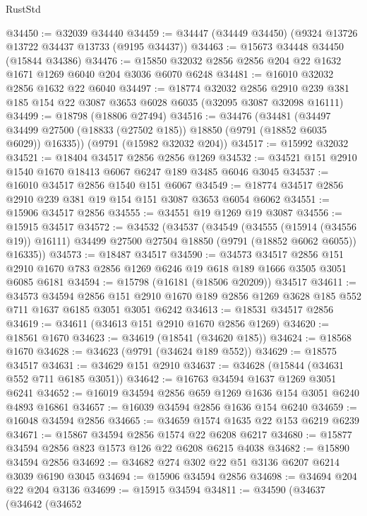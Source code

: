 \begin{lexlean}{RustStd}
\begin{coremodule}
@34450 := @32039 @34440
@34459 := @34447 (@34449 @34450) (@9324 @13726 @13722 @34437 @13733 (@9195 @34437))
@34463 := @15673 @34448 @34450 (@15844 @34386)
@34476 := @15850 @32032 @2856 @2856 @204 @22 @1632 @1671 @1269 @6040 @204 @3036 @6070 @6248
@34481 := @16010 @32032 @2856 @1632 @22 @6040
@34497 := @18774
    @32032
    @2856
    @2910
    @239
    @381
    @185
    @154
    @22
    @3087
    @3653
    @6028
    @6035
    (@32095 @3087 @32098 @16111)
@34499 := @18798 (@18806 @27494)
@34516 := @34476
    (@34481
      (@34497 @34499 @27500 (@18833 (@27502 @185)) @18850 (@9791 (@18852 @6035 @6029)) @16335))
    (@9791 (@15982 @32032 @204))
@34517 := @15992 @32032
@34521 := @18404 @34517 @2856 @2856 @1269
@34532 := @34521 @151 @2910 @1540 @1670 @18413 @6067 @6247 @189 @3485 @6046 @3045
@34537 := @16010 @34517 @2856 @1540 @151 @6067
@34549 := @18774 @34517 @2856 @2910 @239 @381 @19 @154 @151 @3087 @3653 @6054 @6062
@34551 := @15906 @34517 @2856
@34555 := @34551 @19 @1269 @19 @3087
@34556 := @15915 @34517
@34572 := @34532
    (@34537
      (@34549
        (@34555 (@15914 (@34556 @19)) @16111)
        @34499
        @27500
        @27504
        @18850
        (@9791 (@18852 @6062 @6055))
        @16335))
@34573 := @18487 @34517
@34590 := @34573
    @34517
    @2856
    @151
    @2910
    @1670
    @783
    @2856
    @1269
    @6246
    @19
    @618
    @189
    @1666
    @3505
    @3051
    @6085
    @6181
@34594 := @15798 (@16181 (@18506 @20209)) @34517
@34611 := @34573
    @34594
    @2856
    @151
    @2910
    @1670
    @189
    @2856
    @1269
    @3628
    @185
    @552
    @711
    @1637
    @6185
    @3051
    @3051
    @6242
@34613 := @18531 @34517 @2856
@34619 := @34611 (@34613 @151 @2910 @1670 @2856 @1269)
@34620 := @18561 @1670
@34623 := @34619 (@18541 (@34620 @185))
@34624 := @18568 @1670
@34628 := @34623 (@9791 (@34624 @189 @552))
@34629 := @18575 @34517
@34631 := @34629 @151 @2910
@34637 := @34628 (@15844 (@34631 @552 @711 @6185 @3051))
@34642 := @16763 @34594 @1637 @1269 @3051 @6241
@34652 := @16019 @34594 @2856 @659 @1269 @1636 @154 @3051 @6240 @4893 @16861
@34657 := @16039 @34594 @2856 @1636 @154 @6240
@34659 := @16048 @34594 @2856
@34665 := @34659 @1574 @1635 @22 @153 @6219 @6239
@34671 := @15867 @34594 @2856 @1574 @22 @6208 @6217
@34680 := @15877 @34594 @2856 @823 @1573 @126 @22 @6208 @6215 @4038
@34682 := @15890 @34594 @2856
@34692 := @34682 @274 @302 @22 @51 @3136 @6207 @6214 @3039 @6190 @3045
@34694 := @15906 @34594 @2856
@34698 := @34694 @204 @22 @204 @3136
@34699 := @15915 @34594
@34811 := @34590
    (@34637
      (@34642
        (@34652

\end{coremodule}
\end{lexlean}
